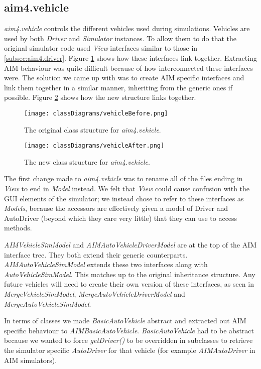 \subsection{aim4.vehicle}
\label{subsec:aim4.vehicle}
\emph{aim4.vehicle} controls the different vehicles used during simulations. Vehicles are used by both \emph{Driver} and \emph{Simulator} instances. To allow them to do that the original simulator code used \emph{View} interfaces similar to those in \ref{subsec:aim4.driver}. Figure \ref{fig:vehicleBefore} shows how these interfaces link together. Extracting AIM behaviour was quite difficult because of how interconnected these interfaces were. The solution we came up with was to create AIM specific interfaces and link them together in a similar manner, inheriting from the generic ones if possible. Figure \ref{fig:vehicleAfter} shows how the new structure links together.

\begin{figure}[htb]
\texttt{[image: classDiagrams/vehicleBefore.png]}
\caption{The original class structure for \emph{aim4.vehicle}.}
\label{fig:vehicleBefore}
\end{figure}

\begin{figure}[htb]
\texttt{[image: classDiagrams/vehicleAfter.png]}
\caption{The new class structure for \emph{aim4.vehicle}.}
\label{fig:vehicleAfter}
\end{figure}

The first change made to \emph{aim4.vehicle} was to rename all of the files ending in \emph{View} to end in \emph{Model} instead. We felt that \emph{View} could cause confusion with the GUI elements of the simulator; we instead chose to refer to these interfaces as \emph{Models}, because the accessors are effectively given a model of Driver and AutoDriver (beyond which they care very little) that they can use to access methods.

\emph{AIMVehicleSimModel} and \emph{AIMAutoVehicleDriverModel} are at the top of the AIM interface tree. They both extend their generic counterparts. \emph{AIMAutoVehicleSimModel} extends these two interfaces along with \emph{AutoVehicleSimModel}. This matches up to the original inheritance structure. Any future vehicles will need to create their own version of these interfaces, as seen in \emph{MergeVehicleSimModel}, \emph{MergeAutoVehicleDriverModel} and \emph{MergeAutoVehicleSimModel}. 

In terms of classes we made \emph{BasicAutoVehicle} abstract and extracted out AIM specific behaviour to \emph{AIMBasicAutoVehicle}. \emph{BasicAutoVehicle} had to be abstract because we wanted to force \emph{getDriver()} to be overridden in subclasses to retrieve the simulator specific \emph{AutoDriver} for that vehicle (for example \emph{AIMAutoDriver} in AIM simulators).

